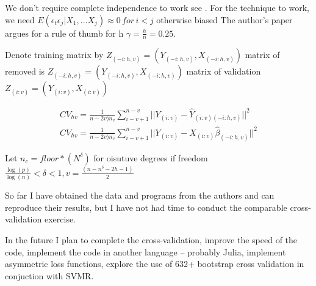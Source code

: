 \documentclass[12pt]{article}
\newcommand{\iv}{{(i:v)}}
\newcommand{\pihv}{{(-i:h,v)}}
\newcommand{\mihv}{{(-i:h,v)}}
\begin{document}
We don't require complete independence to work see \cite{burman94}.
For the technique to work, we need 
$E(\epsilon_t\epsilon_j|X_1, \ldots X_j)\approx0 \, for \, i<j$ otherwise biased
The author's paper argues for 
a rule of thumb for h $\gamma= \frac{h}{n} =0.25$.


Denote training matrix by $Z_\mihv=(Y_\mihv,X_\mihv)$ matrix of removed  is $Z_\pihv=(Y_\pihv,X_\pihv)$ matrix of validation  $Z_\iv=(Y_\iv,X_\iv)$


  \begin{gather}
    CV_{hv}=\frac{1}{n-2v)n_v}\sum_{i-v+1}^{n-v} || Y_\iv-\hat{Y}_{\iv\mihv}||^2\\
    CV_{hv}=\frac{1}{n-2v)n_v}\sum_{i-v+1}^{n-v} || Y_\iv-X_\iv\hat{\beta}_\mihv||^2
  \end{gather}



Let $n_c= floor*(N^\delta)$ for oisutuve degrees if freedom $\frac{\log(p)}{\log(n)}<\delta<1, v=\frac{(n-n^\delta-2h-1)}{2}$


So far  I have
 obtained the data and programs from the authors and can reproduce 
their results, but I have not had 
time to conduct the comparable cross-validation exercise.

In the future I plan to complete the cross-validation,
improve the speed of the code,
implement the code in another language -- probably Julia,
implement asymmetric loss functions,
explore the use of 632+ bootstrap cross validation in conjuction with 
SVMR.







\end{document}
